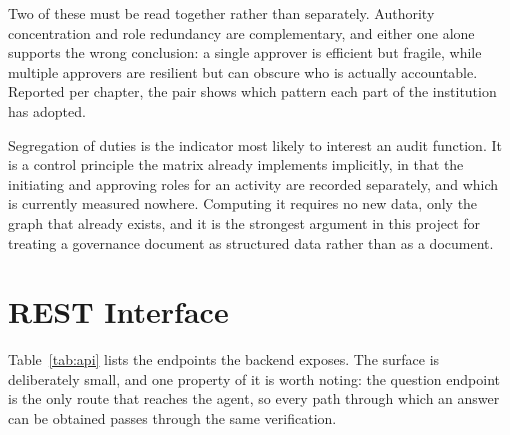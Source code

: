 Two of these must be read together rather than separately. Authority concentration and
role redundancy are complementary, and either one alone supports the wrong conclusion: a
single approver is efficient but fragile, while multiple approvers are resilient but can
obscure who is actually accountable. Reported per chapter, the pair shows which pattern
each part of the institution has adopted.

Segregation of duties is the indicator most likely to interest an audit function. It is a
control principle the matrix already implements implicitly, in that the initiating and
approving roles for an activity are recorded separately, and which is currently measured
nowhere. Computing it requires no new data, only the graph that already exists, and it is
the strongest argument in this project for treating a governance document as structured
data rather than as a document.

\section{REST Interface}

Table~\ref{tab:api} lists the endpoints the backend exposes. The surface is deliberately
small, and one property of it is worth noting: the question endpoint is the only route
that reaches the agent, so every path through which an answer can be obtained passes
through the same verification.

